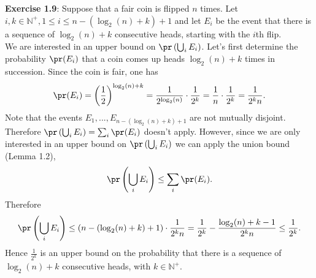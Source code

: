 \textbf{Exercise 1.9}: Suppose that a fair coin is flipped $n$ times. Let $i, k \in
\mathbb{N}^+, 1 \leq i \leq n - \left(\log_2(n) + k \right) + 1$ and let $E_i$ be the
event that there is a sequence of $\log_2(n) + k$ consecutive heads, starting with
the $i$th flip. \\
We are interested in an upper bound on $\pr\left(\bigcup_i E_i\right)$. Let's first
determine the probability $\pr(E_i)$ that a coin comes up heads $\log_2(n) + k$
times in succession. Since the coin is fair, one has
\[ \pr(E_i)
  = \left(\frac{1}{2}\right)^{\log_2(n) + k}
  = \frac{1}{2^{\log_2(n)}} \cdot \frac{1}{2^k}
  = \frac{1}{n} \cdot \frac{1}{2^k}
  = \frac{1}{2^k n}.
\]
Note that the events $E_1,...,E_{n - \left(\log_2(n) + k \right) + 1}$ are not
mutually disjoint. Therefore $\pr\left(\bigcup_i E_i\right) = \sum_i \pr(E_i)$
doesn't apply. However, since we are only interested in an upper bound on
$\pr\left(\bigcup_i E_i\right)$ we can apply the union bound (Lemma 1.2),
\[ \pr\left(\bigcup_i E_i\right) \leq \sum_i \pr(E_i). \]
Therefore
\[ \pr\left(\bigcup_i E_i\right)
  \leq \left(n - \left(\log_2(n) + k \right) + 1\right) \cdot \frac{1}{2^k n}
  = \frac{1}{2^k} - \frac{\log_2(n) + k - 1}{2^k n}
  \leq \frac{1}{2^k}.
\]
Hence $\frac{1}{2^k}$ is an upper bound on the probability that there is a
sequence of $\log_2(n) + k$ consecutive heads, with $k \in \mathbb{N}^+$.
\\[0.5cm]

